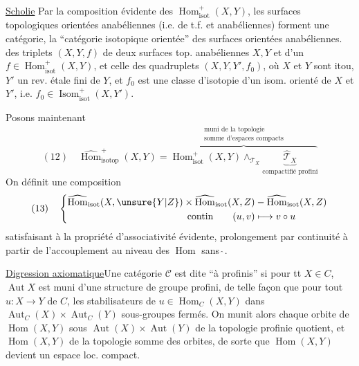 \uline{Scholie} Par la composition évidente des $\operatorname{Hom}_{\mathrm{isot}}^+(X,Y)$, les surfaces topologiques orientées anabéliennes (i.e. de t.f. et anabéliennes)  forment une catégorie, la ``catégorie isotopique orientée'' des surfaces orientées anabéliennes.   des triplets $(X,Y,f)$ de deux surfaces top. anabéliennes $X,Y$ et d'un $f\in\operatorname{Hom}_{\mathrm{isot}}^+(X,Y)$, et celle des quadruplets $(X,Y,Y',f_0)$, où $X$ et $Y$ sont itou, $Y'$ un rev. étale fini de $Y$, et $f_0$ est une classe d'isotopie d'un isom. orienté de $X$ et $Y'$, i.e. $f_0\in\operatorname{Isom}_{\mathrm{isot}}^+(X,Y')$.

Posons maintenant
\[
(12)\quad
\widehat{\operatorname{Hom}}^{+}_{\mathrm{isotop}}(X,Y)
=\overbrace{\operatorname{Hom}^{+}_{\mathrm{isot}}(X,Y)\mathop{\wedge}_{\mathcal{T}_X}
\underbrace{\widehat{\mathcal{T}}_X}_{\text{compactifié profini}}}^{\substack{\text{muni de la topologie}\\\text{somme d'espaces compacts}}}
\]
On définit une composition
\[
(13)\quad\left\{
\begin{aligned}
\widehat{\operatorname{Hom}}_{\mathrm{isot}}(X,\unsure{Y|Z})\times
\widehat{\operatorname{Hom}}_{\mathrm{isot}}(X,Z)
&\mathbin{-}\widehat{\operatorname{Hom}}_{\mathrm{isot}}(X,Z)\\
\text{contin}\qquad (u,v)&\longmapsto v\circ u
\end{aligned}\right.
\]
satisfaisant à la propriété d'associativité évidente,  prolongement par continuité à partir de l'accouplement au niveau des $\operatorname{Hom}$ sans $\hat{\ }$. 

\uline{Digression axiomatique}\quad Une catégorie $\mathcal{C}$ est dite   ``à   profinis'' si pour tt $X\in C$, $\operatorname{Aut}X$ est muni d'une structure de groupe profini, de telle façon que pour tout $u:X\longrightarrow Y$ de $C$, les stabilisateurs de $u\in\operatorname{Hom}_C(X,Y)$ dans $\operatorname{Aut}_C(X)\times\operatorname{Aut}_C(Y)$    sous-groupes fermés.  On munit alors chaque orbite de $\operatorname{Hom}(X,Y)$ sous $\operatorname{Aut}(X)\times\operatorname{Aut}(Y)$ de la topologie profinie quotient, et $\operatorname{Hom}(X,Y)$ de la topologie  somme des orbites, de sorte que $\operatorname{Hom}(X,Y)$ devient un espace loc. compact.

